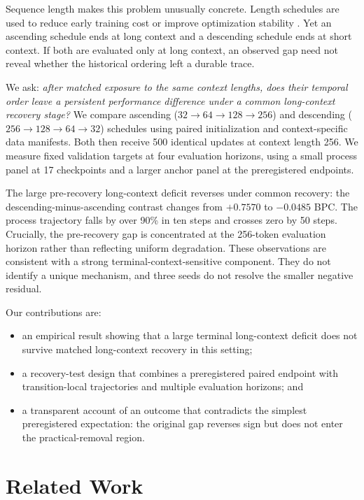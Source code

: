 \documentclass{article}
\begin{document}
Sequence length makes this problem unusually concrete. Length schedules are used to reduce early training cost or improve optimization stability \citep{press2021shortformer,li2022slw,pouransari2024dataset}. Yet an ascending schedule ends at long context and a descending schedule ends at short context. If both are evaluated only at long context, an observed gap need not reveal whether the historical ordering left a durable trace.

We ask: \emph{after matched exposure to the same context lengths, does their temporal order leave a persistent performance difference under a common long-context recovery stage?} We compare ascending ($32{\rightarrow}64{\rightarrow}128{\rightarrow}256$) and descending ($256{\rightarrow}128{\rightarrow}64{\rightarrow}32$) schedules using paired initialization and context-specific data manifests. Both then receive 500 identical updates at context length 256. We measure fixed validation targets at four evaluation horizons, using a small process panel at 17 checkpoints and a larger anchor panel at the preregistered endpoints.

The large pre-recovery long-context deficit reverses under common recovery: the descending-minus-ascending contrast changes from $+0.7570$ to $-0.0485$ BPC. The process trajectory falls by over 90\% in ten steps and crosses zero by 50 steps. Crucially, the pre-recovery gap is concentrated at the 256-token evaluation horizon rather than reflecting uniform degradation. These observations are consistent with a strong terminal-context-sensitive component. They do not identify a unique mechanism, and three seeds do not resolve the smaller negative residual.

Our contributions are:
\begin{itemize}
    \item an empirical result showing that a large terminal long-context deficit does not survive matched long-context recovery in this setting;
    \item a recovery-test design that combines a preregistered paired endpoint with transition-local trajectories and multiple evaluation horizons; and
    \item a transparent account of an outcome that contradicts the simplest preregistered expectation: the original gap reverses sign but does not enter the practical-removal region.
\end{itemize}

\section{Related Work}
\end{document}
